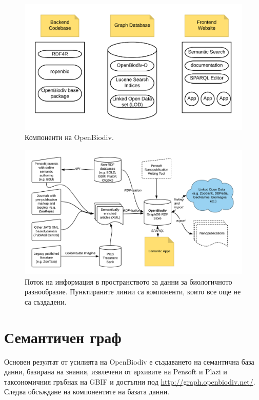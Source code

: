 \begin{figure}
\centering
\includegraphics[width=\textwidth]{Figures/components-openbiodiv}
\decoRule
\caption[OpenBiodiv Components]{Компоненти на OpenBiodiv.}
\label{fig:openbiodiv-components}
\end{figure}

\begin{figure}
\centering
\includegraphics[width=\textwidth]{Figures/openbiodiv-sources}
\decoRule
\caption[OpenBiodiv Components]{Поток на информация в пространството за данни за биологичното разнообразие. Пунктираните линии са компоненти, които все още не са създадени.}
\label{fig:openbiodiv-sources}
\end{figure}

\section{Семантичен граф}

Основен резултат от усилията на OpenBiodiv е създаването на семантична база данни, базирана на знания, извлечени от архивите на Pensoft и Plazi и таксономичния гръбнак на GBIF и достъпни под \url{http://graph.openbiodiv.net/}. Следва обсъждане на компонентите на базата данни.

